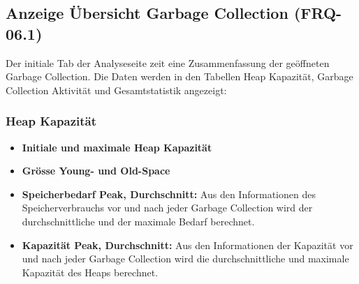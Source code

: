 \subsection{Anzeige Übersicht Garbage Collection (FRQ-06.1)}\label{standardreport}
Der initiale Tab der Analyseseite zeit eine Zusammenfassung der geöffneten Garbage Collection. Die Daten werden in den Tabellen Heap Kapazität, Garbage Collection Aktivität und Gesamtstatistik angezeigt:

\subsubsection{Heap Kapazität}
\begin{itemize}
	\item \textbf{Initiale und maximale Heap Kapazität}
	\item \textbf{Grösse Young- und Old-Space}
	\item \textbf{Speicherbedarf Peak, Durchschnitt:} Aus den Informationen des Speicherverbrauchs vor und nach jeder Garbage Collection wird der durchschnittliche und der maximale Bedarf berechnet.
	\item \textbf{Kapazität Peak, Durchschnitt:} Aus den Informationen der Kapazität vor und nach jeder Garbage Collection wird die durchschnittliche und maximale Kapazität des Heaps berechnet.

\end{itemize}
